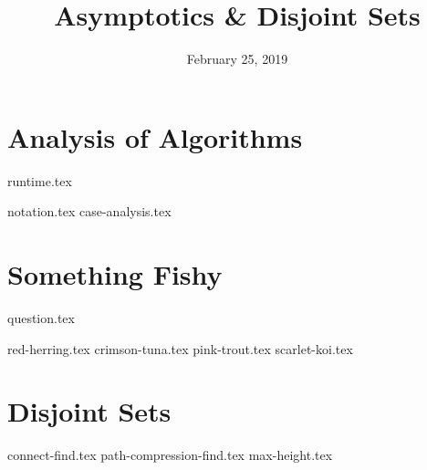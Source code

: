 \documentclass[11pt]{exam}
\title{Asymptotics \& Disjoint Sets}
\date{February 25, 2019}
\begin{document}
\maketitle

\section{Analysis of Algorithms}
{runtime.tex}
\begin{questions}
{notation.tex}
{case-analysis.tex}
\end{questions}

\clearpage

\section{Something Fishy}
{question.tex}
\begin{questions}
{red-herring.tex}
{crimson-tuna.tex}
{pink-trout.tex}
{scarlet-koi.tex}
\end{questions}

\clearpage
\section{Disjoint Sets}
\begin{questions}
{connect-find.tex}
{path-compression-find.tex}
{max-height.tex}
\end{questions}

\clearpage
\end{document}
